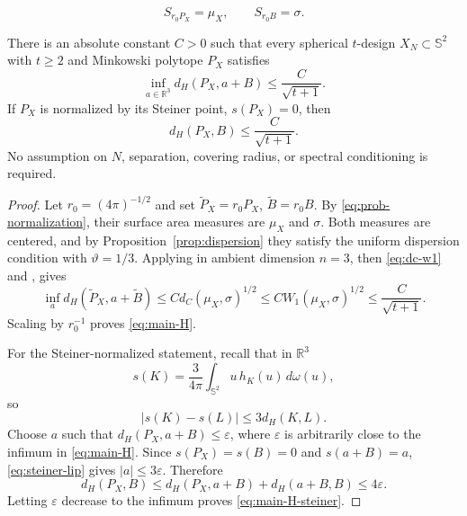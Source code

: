 \documentclass[10pt,a4paper]{amsart}
\newcommand{\R}{\mathbb R}
\newcommand{\Sph}{\mathbb S}
\newcommand{\eps}{\varepsilon}
\begin{document}
\begin{equation}\label{eq:prob-normalization}
S_{r_0P_X}=\mu_X,\qquad S_{r_0B}=\sigma.
\end{equation}

\begin{theorem}\label{thm:quantitative-sphericity}
There is an absolute constant $C>0$ such that every spherical $t$-design $X_N\subset\Sph^2$ with $t\ge2$ and Minkowski polytope $P_X$ satisfies
\begin{equation}\label{eq:main-H}
\inf_{a\in\R^3}d_H(P_X,a+B)\le\frac{C}{\sqrt{t+1}}.
\end{equation}
If $P_X$ is normalized by its Steiner point, $s(P_X)=0$, then
\begin{equation}\label{eq:main-H-steiner}
d_H(P_X,B)\le\frac{C}{\sqrt{t+1}}.
\end{equation}
No assumption on $N$, separation, covering radius, or spectral conditioning is required.
\end{theorem}

\begin{proof}
Let $r_0=(4\pi)^{-1/2}$ and set $\widetilde P_X=r_0P_X$, $\widetilde B=r_0B$. By \eqref{eq:prob-normalization}, their surface area measures are $\mu_X$ and $\sigma$. Both measures are centered, and by Proposition~\ref{prop:dispersion} they satisfy the uniform dispersion condition with $\vartheta=1/3$. Applying  in ambient dimension $n=3$, then \eqref{eq:dc-w1} and , gives
\[
\inf_a d_H(\widetilde P_X,a+\widetilde B)
\le C d_C(\mu_X,\sigma)^{1/2}
\le C W_1(\mu_X,\sigma)^{1/2}
\le \frac{C}{\sqrt{t+1}}.
\]
Scaling by $r_0^{-1}$ proves \eqref{eq:main-H}.

For the Steiner-normalized statement, recall that in $\R^3$
\[
s(K)=\frac{3}{4\pi}\int_{\Sph^2}u\,h_K(u)\,d\omega(u),
\]
so
\begin{equation}\label{eq:steiner-lip}
|s(K)-s(L)|\le3d_H(K,L).
\end{equation}
Choose $a$ such that $d_H(P_X,a+B)\le\eps$, where $\eps$ is arbitrarily close to the infimum in \eqref{eq:main-H}. Since $s(P_X)=s(B)=0$ and $s(a+B)=a$, \eqref{eq:steiner-lip} gives $|a|\le3\eps$. Therefore
\[
d_H(P_X,B)
\le d_H(P_X,a+B)+d_H(a+B,B)
\le4\eps.
\]
Letting $\eps$ decrease to the infimum proves \eqref{eq:main-H-steiner}.
\end{proof}
\end{document}

